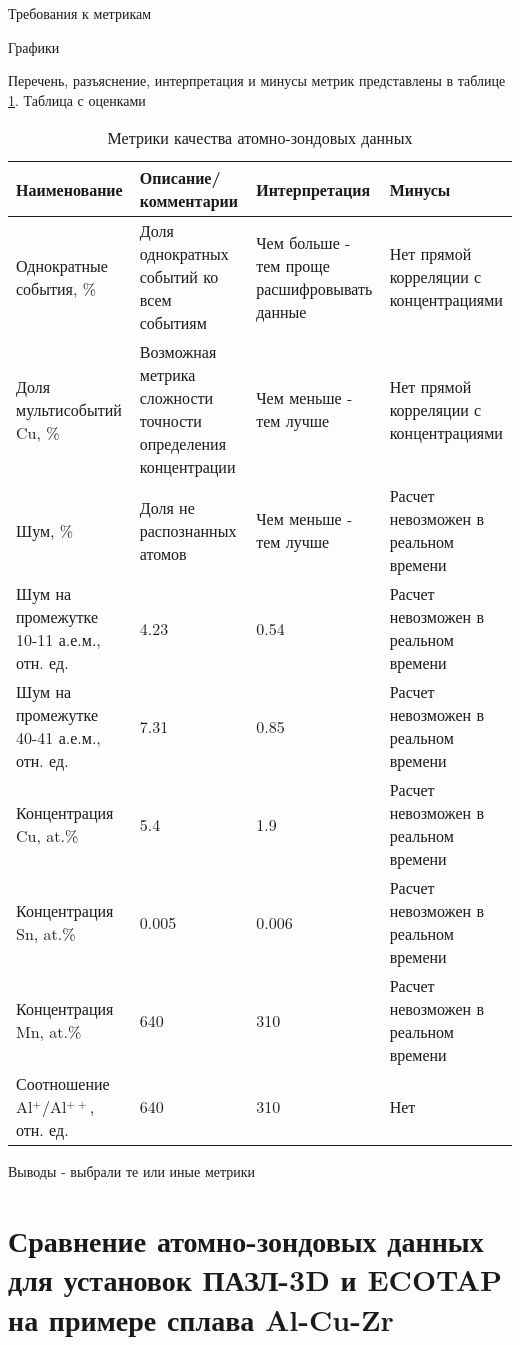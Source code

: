 Требования к метрикам

Графики

Перечень, разъяснение, интерпретация и минусы метрик представлены в таблице \cref{tab:params_expl}.
Таблица с оценками

\begin{table} [htbp]
	\centering
	\caption{Метрики качества атомно-зондовых данных}
	\label{tab:params_expl}
	\begin{SingleSpace}
		\begin{tabularx}{\textwidth} {| X | X | X | X |}
			\hline
			Наименование & Описание/ комментарии & Интерпретация & Минусы  \\ \hline
			Однократные события, \% & {Доля однократных событий ко всем событиям}  & {Чем больше - тем проще расшифровывать данные}  & {Нет прямой корреляции с концентрациями}              \\ \hline
			Доля мультисобытий Cu, \% & Возможная метрика сложности точности определения концентрации & Чем меньше - тем лучше & Нет прямой корреляции с концентрациями               \\ \hline
			Шум, \%         & Доля не распознанных атомов  & Чем меньше - тем лучше  & Расчет невозможен в реальном времени               \\ \hline
			Шум на промежутке 10-11 а.е.м., отн. ед.       & 4.23 & 0.54 & Расчет невозможен в реальном времени              \\ \hline
			Шум на промежутке 40-41 а.е.м., отн. ед.      & 7.31 & 0.85 & Расчет невозможен в реальном времени               \\ \hline
			Концентрация Cu, at.\% & 5.4   & 1.9   & Расчет невозможен в реальном времени  \\ \hline
			Концентрация Sn, at.\%        & 0.005 & 0.006 & Расчет невозможен в реальном времени \\ \hline
			Концентрация Mn, at.\%    & 640   & 310   & Расчет невозможен в реальном времени   \\ \hline
			Соотношение Al$^+$/Al$^{++}$, отн. ед.    & 640   & 310   & Нет   \\ \hline
		\end{tabularx}
	\end{SingleSpace}
\end{table}

\FloatBarrier
Выводы - выбрали те или иные метрики

\FloatBarrier

\section{Сравнение атомно-зондовых данных для установок ПАЗЛ-3D и ECOTAP на примере сплава Al-Cu-Zr}\label{sec:ch3/sect4}


